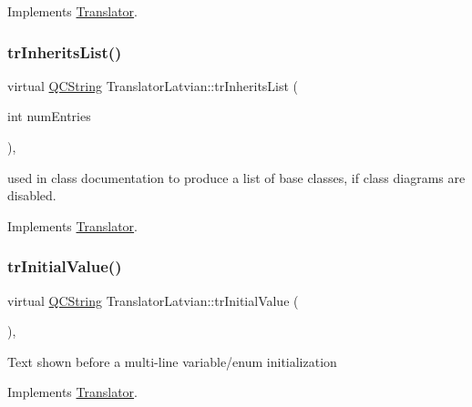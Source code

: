 Implements \mbox{\hyperlink{class_translator}{Translator}}.

\mbox{\label{class_translator_latvian_a4201f12dd064159256b38f14d61c609a}} 
\subsubsection{\texorpdfstring{trInheritsList()}{trInheritsList()}}
{\footnotesize\ttfamily virtual \mbox{\hyperlink{class_q_c_string}{Q\+C\+String}} Translator\+Latvian\+::tr\+Inherits\+List (\begin{DoxyParamCaption}\item[{int}]{num\+Entries }\end{DoxyParamCaption})\hspace{0.3cm}{\ttfamily [inline]}, {\ttfamily [virtual]}}

used in class documentation to produce a list of base classes, if class diagrams are disabled. 

Implements \mbox{\hyperlink{class_translator}{Translator}}.

\mbox{\label{class_translator_latvian_a19fe082bc876f6bbcbc680ca0d9d4f41}} 
\subsubsection{\texorpdfstring{trInitialValue()}{trInitialValue()}}
{\footnotesize\ttfamily virtual \mbox{\hyperlink{class_q_c_string}{Q\+C\+String}} Translator\+Latvian\+::tr\+Initial\+Value (\begin{DoxyParamCaption}{ }\end{DoxyParamCaption})\hspace{0.3cm}{\ttfamily [inline]}, {\ttfamily [virtual]}}

Text shown before a multi-\/line variable/enum initialization 

Implements \mbox{\hyperlink{class_translator}{Translator}}.

\mbox{\label{class_translator_latvian_a4350c6a3e2f8445f686d682c610c9084}} 

